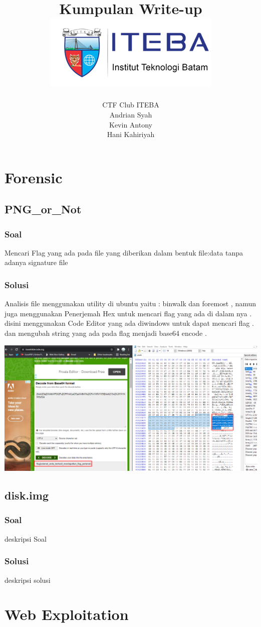 \documentclass[a4paper, 12pt]{report}
\title{
    \Huge
    {Kumpulan Write-up}\\
    \vfill
    {\includegraphics[scale=2]{iteba.png}}
}
\author{CTF Club ITEBA\\Andrian Syah\\Kevin Antony\\Hani Kahiriyah}
\date{} %
\begin{document}
\maketitle

\tableofcontents


\newpage
\chapter*{Forensic}

\section*{PNG\_or\_Not}
\subsection*{Soal}
Mencari Flag yang ada pada file yang diberikan dalam bentuk file:data tanpa adanya signature file

\subsection*{Solusi}
Analisis file menggunakan utility di ubuntu yaitu : binwalk dan foremost , namun juga menggunakan Penerjemah Hex 
untuk mencari flag yang ada di dalam nya . disini menggunakan Code Editor yang ada diwindows untuk dapat mencari flag .
dan mengubah string yang ada pada flag menjadi base64 encode .

{\includegraphics[scale=0.4]{pngornot.png}}

\section*{disk.img}
\subsection*{Soal}
deskripsi Soal
\subsection*{Solusi}
deskripsi solusi

\newpage
\chapter*{Web Exploitation}
\end{document}
